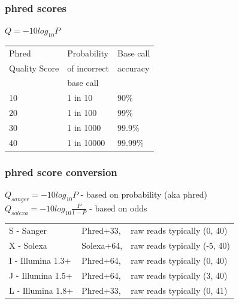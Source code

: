 \documentclass{beamer}
\begin{document}
\begin{frame}
  \frametitle{phred scores}
$Q = -10log_{10}P$
\begin{center}
\begin{tabular}{|l|l|l|}
\hline
Phred & Probability &	Base call \\
Quality Score	& of incorrect  & accuracy \\
 & base call & \\
\hline
10	&	1 in 10	&	$90\%$\\
20	&	1 in 100 &	$99\%$\\
30	&	1 in 1000	&	$99.9\%$\\
40	&	1 in 10000	&	$99.99\%$\\
\hline
\end{tabular}
\end{center}
\end{frame}
\begin{frame}
  \frametitle{phred score conversion}
$Q_{sanger} = -10log_{10}P$ - based on probability (aka phred)
\\

$Q_{solexa} = -10log_{10}\frac{P}{1-P}$ - based on odds
\begin{center}
\begin{tabular}{ l l l }
S - Sanger        &Phred+33,  &raw reads typically (0, 40) \\
X - Solexa        &Solexa+64, &raw reads typically (-5, 40) \\
I - Illumina 1.3+ &Phred+64,  &raw reads typically (0, 40) \\
J - Illumina 1.5+ &Phred+64,  &raw reads typically (3, 40) \\
L - Illumina 1.8+ &Phred+33,  &raw reads typically (0, 41) \\
\end{tabular}
\end{center}
\end{frame} 
\end{document}
